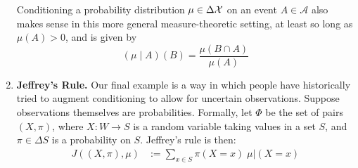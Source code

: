 \begin{enumerate}[wide, label=\textbf{\thesubsection.\arabic*}]
{	

	Conditioning a probability distribution $\mu \in \Delta\mathcal X$ on an event $A \in \mathcal A$ also makes sense in this more general measure-theoretic setting, at least so long as $\mu(A) > 0$, and is given by
	$$
		(\mu \mid A) (B) = \frac{\mu(B \cap A)}{\mu(A)}
	$$
	}


	\item
	\textbf{Jeffrey's Rule.}
	Our final example is a way in which 
		people have historically tried to augment conditioning 
		to allow for uncertain observations. 
	Suppose observations themselves are probabilities.
	Formally, let $\Phi$ be the set of pairs $(X,\pi)$,
	where $X : W \to S$ is a random variable taking values in a set $S$,
	and $\pi \in \Delta S$ is a probability on
	$S$.
	Jeffrey's rule is then:
	\begin{align*}
		{J}((X,\pi),
		\mu) &:= \sum_{x \in S} \pi(X{=}x) \;  \mu \big|
            (X{=}x)
	\end{align*}


\end{enumerate}
